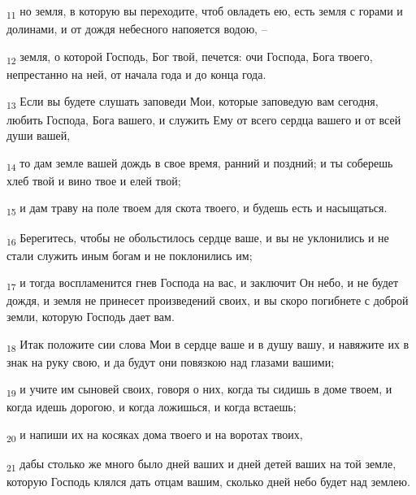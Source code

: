 \begin{tcolorbox}
\textsubscript{11} но земля, в которую вы переходите, чтоб овладеть ею, есть земля с горами и долинами, и от дождя небесного напояется водою, --
\end{tcolorbox}
\begin{tcolorbox}
\textsubscript{12} земля, о которой Господь, Бог твой, печется: очи Господа, Бога твоего, непрестанно на ней, от начала года и до конца года.
\end{tcolorbox}
\begin{tcolorbox}
\textsubscript{13} Если вы будете слушать заповеди Мои, которые заповедую вам сегодня, любить Господа, Бога вашего, и служить Ему от всего сердца вашего и от всей души вашей,
\end{tcolorbox}
\begin{tcolorbox}
\textsubscript{14} то дам земле вашей дождь в свое время, ранний и поздний; и ты соберешь хлеб твой и вино твое и елей твой;
\end{tcolorbox}
\begin{tcolorbox}
\textsubscript{15} и дам траву на поле твоем для скота твоего, и будешь есть и насыщаться.
\end{tcolorbox}
\begin{tcolorbox}
\textsubscript{16} Берегитесь, чтобы не обольстилось сердце ваше, и вы не уклонились и не стали служить иным богам и не поклонились им;
\end{tcolorbox}
\begin{tcolorbox}
\textsubscript{17} и тогда воспламенится гнев Господа на вас, и заключит Он небо, и не будет дождя, и земля не принесет произведений своих, и вы скоро погибнете с доброй земли, которую Господь дает вам.
\end{tcolorbox}
\begin{tcolorbox}
\textsubscript{18} Итак положите сии слова Мои в сердце ваше и в душу вашу, и навяжите их в знак на руку свою, и да будут они повязкою над глазами вашими;
\end{tcolorbox}
\begin{tcolorbox}
\textsubscript{19} и учите им сыновей своих, говоря о них, когда ты сидишь в доме твоем, и когда идешь дорогою, и когда ложишься, и когда встаешь;
\end{tcolorbox}
\begin{tcolorbox}
\textsubscript{20} и напиши их на косяках дома твоего и на воротах твоих,
\end{tcolorbox}
\begin{tcolorbox}
\textsubscript{21} дабы столько же много было дней ваших и дней детей ваших на той земле, которую Господь клялся дать отцам вашим, сколько дней небо будет над землею.
\end{tcolorbox}
